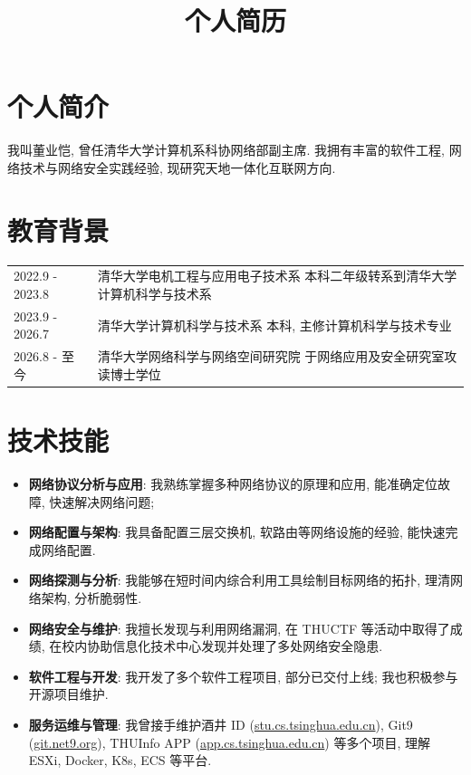 \documentclass[a4paper, 10pt]{article}
\title{个人简历}
\date{}
\begin{document}
\setlength{\droptitle}{-6em}
\maketitle
\vspace{-4em}

\section*{个人简介}
我叫董业恺, 曾任清华大学计算机系科协网络部副主席. 我拥有丰富的软件工程, 网络技术与网络安全实践经验, 现研究天地一体化互联网方向.

\section*{教育背景}
\noindent
\begin{tabular}{p{}p{}}
    2022.9 - 2023.8 & 清华大学电机工程与应用电子技术系 \newline
        \fontsize{8pt}{10pt}\selectfont 本科二年级转系到清华大学计算机科学与技术系 \\

    2023.9 - 2026.7 & 清华大学计算机科学与技术系 \newline
        \fontsize{8pt}{10pt}\selectfont 本科, 主修计算机科学与技术专业 \\
        
    2026.8 - 至今 & 清华大学网络科学与网络空间研究院 \newline
        \fontsize{8pt}{10pt}\selectfont 于网络应用及安全研究室攻读博士学位 \\
\end{tabular}

\section*{技术技能}
\begin{itemize}[left=0pt]
    \item \textbf{网络协议分析与应用}: 我熟练掌握多种网络协议的原理和应用, 能准确定位故障, 快速解决网络问题;
    \item \textbf{网络配置与架构}: 我具备配置三层交换机, 软路由等网络设施的经验, 能快速完成网络配置.
    \item \textbf{网络探测与分析}: 我能够在短时间内综合利用工具绘制目标网络的拓扑, 理清网络架构, 分析脆弱性.
    \item \textbf{网络安全与维护}: 我擅长发现与利用网络漏洞, 在 THUCTF 等活动中取得了成绩, 在校内协助信息化技术中心发现并处理了多处网络安全隐患.
    \item \textbf{软件工程与开发}: 我开发了多个软件工程项目, 部分已交付上线; 我也积极参与开源项目维护.
    \item \textbf{服务运维与管理}: 我曾接手维护酒井 ID (\href{https://stu.cs.tsinghua.edu.cn}{stu.cs.tsinghua.edu.cn}), Git9 (\href{https://git.net9.org}{git.net9.org}), THUInfo APP (\href{https://app.cs.tsinghua.edu.cn}{app.cs.tsinghua.edu.cn}) 等多个项目, 理解 ESXi, Docker, K8s, ECS 等平台.
\end{itemize}
\end{document}
